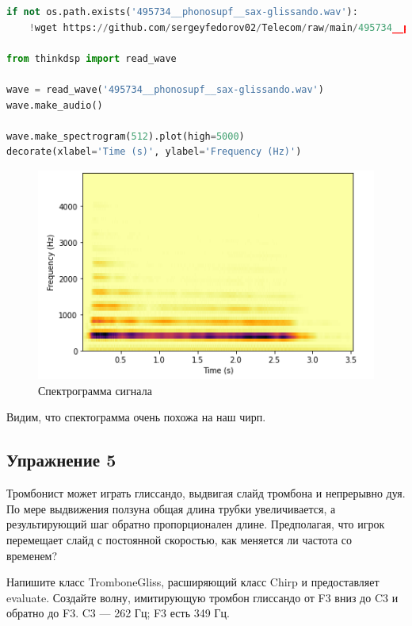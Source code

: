 \begin{lstlisting}[language=Python]
if not os.path.exists('495734__phonosupf__sax-glissando.wav'):
    !wget https://github.com/sergeyfedorov02/Telecom/raw/main/495734__phonosupf__sax-glissando.wav
    
from thinkdsp import read_wave

wave = read_wave('495734__phonosupf__sax-glissando.wav')
wave.make_audio()

wave.make_spectrogram(512).plot(high=5000)
decorate(xlabel='Time (s)', ylabel='Frequency (Hz)')
\end{lstlisting}

\begin{figure}[H]
	\begin{center}
		\includegraphics[scale=1]{fig/lab03/lab03_12.png}
		\caption{Спектрограмма сигнала}
	\end{center}
\end{figure}

Видим, что спектограмма очень похожа на наш чирп.

\subsection{Упражнение 5}

Тромбонист может играть глиссандо, выдвигая слайд тромбона и непрерывно дуя. По мере выдвижения ползуна общая длина трубки увеличивается, а результирующий шаг обратно пропорционален длине.
Предполагая, что игрок перемещает слайд с постоянной скоростью, как меняется ли частота со временем?

\noindent Напишите класс TromboneGliss, расширяющий класс Chirp и предоставляет evaluate. Создайте волну, имитирующую тромбон глиссандо от F3 вниз до C3 и обратно до F3. C3 — 262 Гц; F3 есть 349 Гц.

